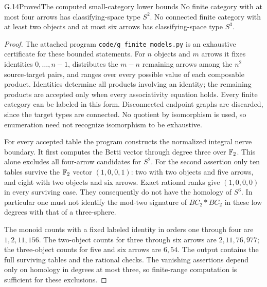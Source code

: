 \begin{claim}{G.14}{Proved}{The computed small-category lower bounds}
No finite category with at most four arrows has classifying-space type $S^2$. No connected finite category with at least two objects and at most six arrows has classifying-space type $S^3$.
\end{claim}
\begin{proof}
The attached program \texttt{code/g\_finite\_models.py} is an exhaustive certificate for these bounded statements. For $n$ objects and $m$ arrows it fixes identities $0,\ldots,n-1$, distributes the $m-n$ remaining arrows among the $n^2$ source-target pairs, and ranges over every possible value of each composable product. Identities determine all products involving an identity; the remaining products are accepted only when every associativity equation holds. Every finite category can be labeled in this form. Disconnected endpoint graphs are discarded, since the target types are connected. No quotient by isomorphism is used, so enumeration need not recognize isomorphism to be exhaustive.

For every accepted table the program constructs the normalized integral nerve boundary. It first computes the Betti vector through degree three over $\mathbb F_2$. This alone excludes all four-arrow candidates for $S^2$. For the second assertion only ten tables survive the $\mathbb F_2$ vector $(1,0,0,1)$: two with two objects and five arrows, and eight with two objects and six arrows. Exact rational ranks give $(1,0,0,0)$ in every surviving case. They consequently do not have the homology of $S^3$. In particular one must not identify the mod-two signature of $BC_2*BC_2$ in these low degrees with that of a three-sphere.

The monoid counts with a fixed labeled identity in orders one through four are $1,2,11,156$. The two-object counts for three through six arrows are $2,11,76,977$; the three-object counts for five and six arrows are $6,54$. The output contains the full surviving tables and the rational checks. The vanishing assertions depend only on homology in degrees at most three, so finite-range computation is sufficient for these exclusions.
\end{proof}

